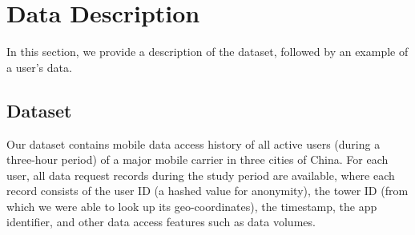 \section{Data Description}\label{data}

In this section, we provide a description of the dataset,
followed by an example of a user's data.

\subsection{Dataset}

Our dataset contains mobile data access history of all active users (during a three-hour period)
of a major mobile carrier in three cities of China.
For each user, all data request records during the study period are available,
where each record consists of the user ID (a hashed value for anonymity), 
the tower ID (from which we were able to look up its geo-coordinates), 
the timestamp, 
the app identifier, 
and other data access features such as data volumes.



